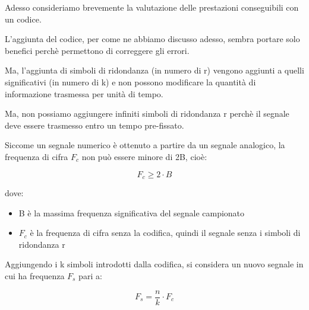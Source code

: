 Adesso consideriamo brevemente la valutazione delle prestazioni conseguibili con un codice. \newline 

L'aggiunta del codice, per come ne abbiamo discusso adesso, sembra portare solo benefici perchè permettono di correggere gli errori. \newline 

Ma, l'aggiunta di simboli di ridondanza (in numero di r) 
vengono aggiunti a quelli significativi (in numero di k) 
e non possono modificare la quantità di informazione trasmessa per unità di tempo. \newline 

Ma, non possiamo aggiungere infiniti simboli di ridondanza r perchè il segnale deve essere trasmesso entro un tempo pre-fissato. \newline 

Siccome un segnale numerico è ottenuto a partire da un segnale analogico, 
la frequenza di cifra $F_c$ non può essere minore di 2B, cioè: 

{
    \Large 
    \begin{equation}
        F_c \ge 2 \cdot B
    \end{equation}
}

dove: 

\begin{itemize}
    \item B è la massima frequenza significativa del segnale campionato 
    \item $F_c$ è la frequenza di cifra senza la codifica, quindi il segnale senza i simboli di ridondanza r
\end{itemize}

Aggiungendo i k simboli introdotti dalla codifica, si considera un nuovo segnale in cui ha frequenza $F_s$ pari a: 

{
    \Large 
    \begin{equation}
        F_s = \frac{n}{k} \cdot F_c
    \end{equation}
}

